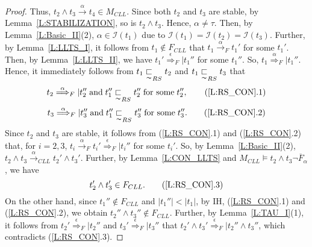 \documentclass{elsarticle}
\theoremstyle{plain}
\theoremstyle{definition}
\begin{document}
\begin{proof}
        Thus, $t_2 \wedge t_3 \stackrel{\alpha}{\longrightarrow} t_4\in M_{{CLL}}$.
        Since both $t_2$ and $t_3$ are stable, by Lemma~\ref{L:STABILIZATION}, so is $t_2 \wedge t_3$.
        Hence, $\alpha \neq \tau$.
        Then, by Lemma~\ref{L:Basic_II}(2), $\alpha \in {\mathcal I}(t_1)$ due to ${\mathcal I}(t_1)={\mathcal I}(t_2)={\mathcal I}(t_3)$.
        Further, by Lemma~\ref{L:LLTS_I}, it follows from $t_1\notin F_{CLL}$ that $t_1 \stackrel{\alpha}{\longrightarrow}_F t_1'$ for some $t_1'$.
        Then, by Lemma~\ref{L:LLTS_II}, we have $t_1' \stackrel{\epsilon}{\Longrightarrow}_F| t_1''$ for some $t_1''$.
        So, $t_1 \stackrel{\alpha}{\Longrightarrow}_F| t_1''$.
        Hence, it immediately follows from   $t_1 \underset{\thicksim}{\sqsubset}_{RS} t_2$ and $t_1 \underset{\thicksim}{\sqsubset}_{RS} t_3$ that
        \[t_2 \stackrel{\alpha}{\Longrightarrow}_F| t_2''\;\text{and}\; t_1'' \underset{\thicksim}{\sqsubset}_{RS} t_2''\;\text{for some}\; t_2'', \tag{\ref{L:RS_CON}.1}\]
        \[t_3 \stackrel{\alpha}{\Longrightarrow}_F| t_3''\;\text{and}\; t_1'' \underset{\thicksim}{\sqsubset}_{RS} t_3''\;\text{for some}\; t_3''. \tag{\ref{L:RS_CON}.2}\]
        Since $t_2$ and $t_3$ are stable, it follows from (\ref{L:RS_CON}.1) and (\ref{L:RS_CON}.2) that, for $i=2,3$, $t_i \stackrel{\alpha}{\longrightarrow}_F t_i' \stackrel{\epsilon}{\Longrightarrow}_F|t_i''$ for some $t_i'$.
        So, by Lemma~\ref{L:Basic_II}(2), $t_2 \wedge t_3  \stackrel{\alpha}{\longrightarrow}_{CLL} t_2'\wedge t_3' $.
        Further, by Lemma~\ref{L:CON_LLTS} and $M_{{CLL}} \models t_2 \wedge t_3 \neg \overline{F}_{\alpha}$, we have
        \[t_2' \wedge t_3' \in F_{{CLL}}.\tag{\ref{L:RS_CON}.3}\]
        On the other hand, since $t_1'' \notin F_{{CLL}}$ and $|t_1''|<|t_1|$, by IH, (\ref{L:RS_CON}.1) and (\ref{L:RS_CON}.2), we obtain $t_2'' \wedge t_3'' \notin F_{{CLL}}$.
        Further,  by Lemma~\ref{L:TAU_I}(1), it follows from  $t_2' \stackrel{\epsilon}{\Longrightarrow}_F|t_2''$ and $t_3' \stackrel{\epsilon}{\Longrightarrow}_F|t_3''$  that $t_2' \wedge t_3' \stackrel{\epsilon}{\Longrightarrow}_F|t_2'' \wedge t_3''$, which contradicts (\ref{L:RS_CON}.3).
\end{proof}
\end{document}
